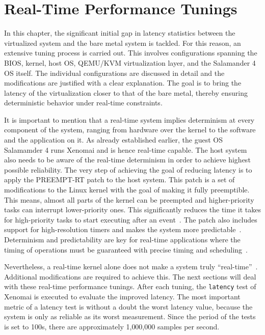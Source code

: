 \documentclass[MMR,Master,english]{twbook}
\begin{document}
\clearpage

\section{Real-Time Performance Tunings}\label{sec:real-time_tunings}

In this chapter, the significant initial gap in latency statistics between the virtualized system and the bare metal system is tackled. For this reason, an extensive tuning process is carried out. This involves configurations spanning the BIOS, kernel, host OS, QEMU/KVM virtualization layer, and the Salamander 4 OS itself. The individual configurations are discussed in detail and the modifications are justified with a clear explanation. The goal is to bring the latency of the virtualization closer to that of the bare metal, thereby ensuring deterministic behavior under real-time constraints.

\bigskip \noindent It is important to mention that a real-time system implies determinism at every component of the system, ranging from hardware over the kernel to the software and the application on it. As already established earlier, the guest OS Salamamder 4 runs Xenomai and is hence real-time capable. The host system also needs to be aware of the real-time determinism in order to achieve highest possible reliability. The very step of achieving the goal of reducing latency is to apply the PREEMPT-RT patch to the host system. This patch is a set of modifications to the Linux kernel with the goal of making it fully preemptible. This means, almost all parts of the kernel can be preempted and higher-priority tasks can interrupt lower-priority ones. This significantly reduces the time it takes for high-priority tasks to start executing after an event~\cite{RealtimeKernelPatchset}. The patch also includes support for high-resolution timers and makes the system more predictable~\cite{lutsykPipelinedMulticoreMachine2020}. Determinism and predictability are key for real-time applications where the timing of operations must be guaranteed with precise timing and scheduling~\cite{rostedtInternalsRTPatch}.

\bigskip \noindent Nevertheless, a real-time kernel alone does not make a system truly “real-time”~\cite{WhatRealtimeLinux}. Additional modifications are required to achieve this. The next sections will deal with these real-time performance tunings. After each tuning, the \texttt{latency} test of Xenomai is executed to evaluate the improved latency. The most important metric of a latency test is without a doubt the worst latency value, because the system is only as reliable as its worst measurement. Since the period of the tests is set to 100\textmu s, there are approximately 1,000,000 samples per second.
\end{document}
